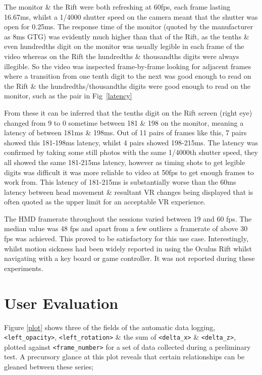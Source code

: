 \documentclass[conference]{acmsiggraph}
\begin{document}
The monitor \& the Rift were both refreshing at 60fps, each frame lasting 16.67ms, whilst a 1/4000 shutter speed on the camera meant that the shutter was open for 0.25ms. The response time of the monitor (quoted by the manufacturer as 8ms GTG) was evidently much higher than that of the Rift, as the tenths \& even hundredths digit on the monitor was usually legible in each frame of the video whereas on the Rift the hundredths \& thousandths digits were always illegible. So the video was inspected frame-by-frame looking for adjacent frames where a transition from one tenth digit to the next was good enough to read on the Rift \& the hundredths/thousandths digits were good enough to read on the monitor, such as the pair in Fig~\ref{latency}

From these it can be inferred that the tenths digit on the Rift screen (right eye) changed from 9 to 0 sometime between 181 \& 198 on the monitor, meaning a latency of between 181ms \& 198ms. Out of 11 pairs of frames like this, 7 pairs showed this 181-198ms latency, whilst 4 pairs showed 198-215ms. The latency was confirmed by taking some still photos with the same 1/4000th shutter speed, they all showed the same 181-215ms latency, however as timing shots to get legible digits was difficult it was more reliable to video at 50fps to get enough frames to work from. This latency of 181-215ms is substantially worse than the 60ms latency between head movement \& resultant VR changes being displayed that is often quoted as the upper limit for an acceptable VR experience.

The HMD framerate throughout the sessions varied between 19 and 60 fps. The median value was 48 fps and apart from a few outliers a framerate of above 30 fps was achieved. This proved to be satisfactory for this use case. Interestingly, whilst motion sickness had been widely reported in using the Oculus Rift whilst navigating with a key board or game controller. It was not reported during these experiments.

\section{User Evaluation}
Figure \ref{plot} shows three of the fields of the automatic data logging, \texttt{<left\_opacity>}, \texttt{<left\_rotation>} \& the sum of \texttt{<delta\_x>} \& \texttt{<delta\_z>}, plotted against \texttt{<frame\_number>} for a set of data collected during a preliminary test. A precursory glance at this plot reveals that certain relationships can be gleaned between these series;
\end{document}
